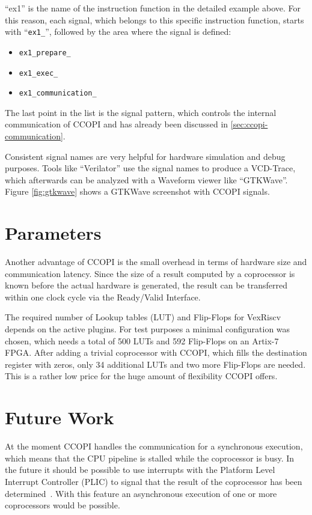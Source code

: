 \documentclass[twoside,twocolumn]{article}
\newcommand{\code}[1]{\texttt{#1}}
\begin{document}
\noindent ``ex1'' is the name of the instruction function in the detailed example
above. For this reason, each signal, which belongs to this specific 
instruction function, starts with ``\code{ex1\_}'', followed by the area 
where the signal is defined:
\begin{itemize}
    \item \code{ex1\_prepare\_<signal-name>}
    \item \code{ex1\_exec\_<signal-name>}
    \item \code{ex1\_communication\_<signal-name>}
\end{itemize}
The last point in the list is the signal pattern, which controls the
internal communication of CCOPI and has already been discussed in
\ref{sec:ccopi-communication}.

Consistent signal names are very helpful for hardware simulation and
debug purposes. Tools like ``Verilator'' use the signal names to
produce a VCD-Trace, which afterwards can be analyzed with a Waveform
viewer like ``GTKWave''. Figure \ref*{fig:gtkwave} shows a GTKWave
screenshot with CCOPI signals. 


\section{Parameters}
Another advantage of CCOPI is the small overhead in terms of 
hardware size and communication latency. Since the size of a result 
computed  by a coprocessor is known before the actual hardware is 
generated, the result can be transferred within one clock cycle via the 
Ready/Valid Interface.

The required number of Lookup tables (LUT) and Flip-Flops for VexRiscv 
depends on the active plugins. For test purposes a minimal configuration 
was chosen, which needs a total of 500 LUTs and 592 Flip-Flops on an 
Artix-7 FPGA. After adding a trivial coprocessor with CCOPI, which 
fills the destination register with zeros, only 34 additional LUTs and 
two more Flip-Flops are needed. This is a rather low price for the huge 
amount of flexibility CCOPI offers.

\section{Future Work}
At the moment CCOPI handles the communication for a synchronous
execution, which means that the CPU pipeline is stalled while the
coprocessor is busy. In the future it should be possible to use
interrupts with the Platform Level Interrupt Controller (PLIC) 
to signal that the result of the coprocessor has been 
determined~\cite{riscv_priv}. With this feature an asynchronous 
execution of one or more coprocessors would be possible. 
\end{document}
